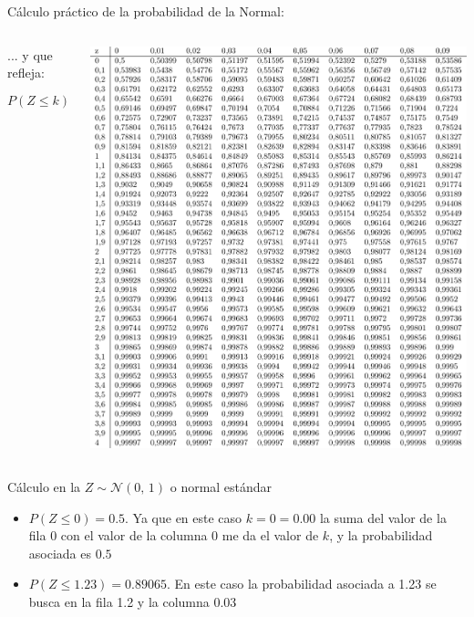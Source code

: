 \documentclass[11pt,handout]{beamer}
\begin{document}
\begin{frame}{Cálculo práctico de la probabilidad de la Normal:}
\begin{columns}
\begin{column}{0.6\textwidth}
\begin{block}{}
... y que refleja:

$$P\left(Z\leq k \right), \ \  k \in \left[ 0 , 4'09 \right]$$
\begin{center}
    
\end{center}
\end{block}
\end{column}
\begin{column}{0.4\textwidth}
\includegraphics[page=1,width=1\textwidth]{probabilidad/distribucion_normal}
\end{column}
\end{columns}


\end{frame}

\begin{frame}{Cálculo en la $Z \sim \mathcal{N}(0,\,1)$ o normal estándar}
\begin{itemize} [<+->]
    \item $P\left(Z\leq 0 \right)=0.5 $. Ya que en este caso $k=0=0.00$ la suma del valor de la fila 0 con el valor de la columna 0 me da el valor de $k$, y la probabilidad asociada es $0.5$
    \item $P\left(Z\leq 1.23 \right)= 0.89065$. En este caso la probabilidad asociada a 1.23 se busca en la fila 1.2 y la columna 0.03 
\end{itemize}



\end{frame}
\end{document}

